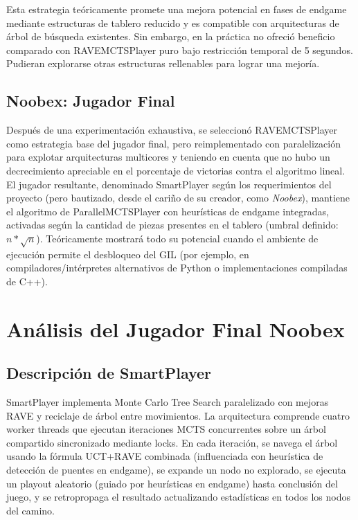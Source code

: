 \documentclass[12pt]{article}
\begin{document}
Esta estrategia teóricamente promete una mejora potencial en fases de endgame mediante estructuras de tablero reducido y es compatible con arquitecturas de árbol de búsqueda existentes. Sin embargo, en la práctica no ofreció beneficio comparado con RAVEMCTSPlayer puro bajo restricción temporal de 5 segundos. Pudieran explorarse otras estructuras rellenables para lograr  una mejoría.


\subsection{Noobex: Jugador Final}

Después de una experimentación exhaustiva, se seleccionó RAVEMCTSPlayer como estrategia base del jugador final, pero reimplementado con paralelización para explotar arquitecturas multicores y teniendo en cuenta que no hubo un decrecimiento apreciable en el porcentaje de victorias contra el algoritmo lineal. El jugador resultante, denominado SmartPlayer según los requerimientos del proyecto (pero bautizado, desde el cariño de su creador, como \textit{Noobex}), mantiene el algoritmo de ParallelMCTSPlayer con heurísticas de endgame integradas, activadas según la cantidad de piezas presentes en el tablero (umbral definido: $n * \sqrt{n}$). Teóricamente mostrará todo su potencial cuando el ambiente de ejecución permite el desbloqueo del GIL (por ejemplo, en compiladores/intérpretes alternativos de Python o implementaciones compiladas de C++).

\section{Análisis del Jugador Final Noobex}

\subsection{Descripción de SmartPlayer}

SmartPlayer implementa Monte Carlo Tree Search paralelizado con mejoras RAVE y reciclaje de árbol entre movimientos. La arquitectura comprende cuatro worker threads que ejecutan iteraciones MCTS concurrentes sobre un árbol compartido sincronizado mediante locks. En cada iteración, se navega el árbol usando la fórmula UCT+RAVE combinada (influenciada con heurística de detección de puentes en endgame), se expande un nodo no explorado, se ejecuta un playout aleatorio (guiado por heurísticas en endgame) hasta conclusión del juego, y se retropropaga el resultado actualizando estadísticas en todos los nodos del camino.
\end{document}
